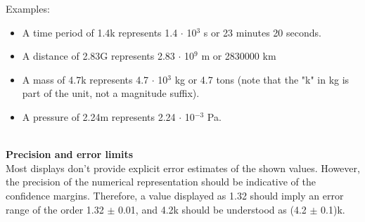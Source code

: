 \documentclass[Orbiter User Manual.tex]{subfiles}
\begin{document}
\noindent
Examples:

\begin{itemize}
\item A time period of 1.4k represents 1.4 $\cdot$ 10$^{3}$ s or 23 minutes 20 seconds.
\item A distance of 2.83G represents 2.83 $\cdot$ 10$^{9}$ m or 2830000 km
\item A mass of 4.7k represents 4.7 $\cdot$ 10$^{3}$ kg or 4.7 tons (note that the "k" in kg is part of the unit, not a magnitude suffix).
\item A pressure of 2.24m represents 2.24 $\cdot$ 10$^{-3}$ Pa.
\end{itemize}

\noindent
\\
\textbf{Precision and error limits}\\
Most displays don't provide explicit error estimates of the shown values. However, the precision of the numerical representation should be indicative of the confidence margins. Therefore, a value displayed as 1.32 should imply an error range of the order 1.32 $\pm$ 0.01, and 4.2k should be understood as (4.2 $\pm$ 0.1)k.
\end{document}
